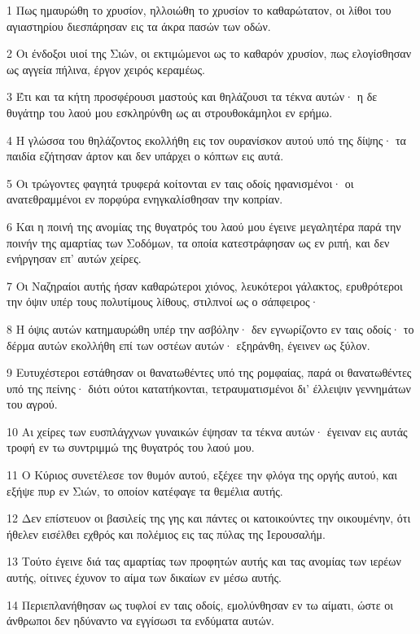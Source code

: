 \par 1 Πως ημαυρώθη το χρυσίον, ηλλοιώθη το χρυσίον το καθαρώτατον, οι λίθοι του αγιαστηρίου διεσπάρησαν εις τα άκρα πασών των οδών.
\par 2 Οι ένδοξοι υιοί της Σιών, οι εκτιμώμενοι ως το καθαρόν χρυσίον, πως ελογίσθησαν ως αγγεία πήλινα, έργον χειρός κεραμέως.
\par 3 Έτι και τα κήτη προσφέρουσι μαστούς και θηλάζουσι τα τέκνα αυτών· η δε θυγάτηρ του λαού μου εσκληρύνθη ως αι στρουθοκάμηλοι εν ερήμω.
\par 4 Η γλώσσα του θηλάζοντος εκολλήθη εις τον ουρανίσκον αυτού υπό της δίψης· τα παιδία εζήτησαν άρτον και δεν υπάρχει ο κόπτων εις αυτά.
\par 5 Οι τρώγοντες φαγητά τρυφερά κοίτονται εν ταις οδοίς ηφανισμένοι· οι ανατεθραμμένοι εν πορφύρα ενηγκαλίσθησαν την κοπρίαν.
\par 6 Και η ποινή της ανομίας της θυγατρός του λαού μου έγεινε μεγαλητέρα παρά την ποινήν της αμαρτίας των Σοδόμων, τα οποία κατεστράφησαν ως εν ριπή, και δεν ενήργησαν επ' αυτών χείρες.
\par 7 Οι Ναζηραίοι αυτής ήσαν καθαρώτεροι χιόνος, λευκότεροι γάλακτος, ερυθρότεροι την όψιν υπέρ τους πολυτίμους λίθους, στιλπνοί ως ο σάπφειρος·
\par 8 Η όψις αυτών κατημαυρώθη υπέρ την ασβόλην· δεν εγνωρίζοντο εν ταις οδοίς· το δέρμα αυτών εκολλήθη επί των οστέων αυτών· εξηράνθη, έγεινεν ως ξύλον.
\par 9 Ευτυχέστεροι εστάθησαν οι θανατωθέντες υπό της ρομφαίας, παρά οι θανατωθέντες υπό της πείνης· διότι ούτοι κατατήκονται, τετραυματισμένοι δι' έλλειψιν γεννημάτων του αγρού.
\par 10 Αι χείρες των ευσπλάγχνων γυναικών έψησαν τα τέκνα αυτών· έγειναν εις αυτάς τροφή εν τω συντριμμώ της θυγατρός του λαού μου.
\par 11 Ο Κύριος συνετέλεσε τον θυμόν αυτού, εξέχεε την φλόγα της οργής αυτού, και εξήψε πυρ εν Σιών, το οποίον κατέφαγε τα θεμέλια αυτής.
\par 12 Δεν επίστευον οι βασιλείς της γης και πάντες οι κατοικούντες την οικουμένην, ότι ήθελεν εισέλθει εχθρός και πολέμιος εις τας πύλας της Ιερουσαλήμ.
\par 13 Τούτο έγεινε διά τας αμαρτίας των προφητών αυτής και τας ανομίας των ιερέων αυτής, οίτινες έχυνον το αίμα των δικαίων εν μέσω αυτής.
\par 14 Περιεπλανήθησαν ως τυφλοί εν ταις οδοίς, εμολύνθησαν εν τω αίματι, ώστε οι άνθρωποι δεν ηδύναντο να εγγίσωσι τα ενδύματα αυτών.
